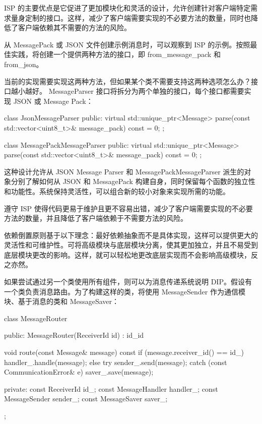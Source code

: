 ISP 的主要优点是它促进了更加模块化和灵活的设计，允许创建针对客户端特定需求量身定制的接口。这样，减少了客户端需要实现的不必要方法的数量，同时也降低了客户端依赖其不需要的方法的风险。

从 MessagePack 或 JSON 文件创建示例消息时，可以观察到 ISP 的示例。按照最佳实践，将创建一个提供两种方法的接口，即 from\_message\_pack 和 from\_json。

当前的实现需要实现这两种方法，但如果某个类不需要支持这两种选项怎么办？接口越小越好。 MessageParser 接口将拆分为两个单独的接口，每个接口都需要实现 JSON 或 Message Pack：

\begin{cpp}
class JsonMessageParser {
public:
    virtual std::unique_ptr<Message>
    parse(const std::vector<uint8_t>& message_pack)
        const = 0;
};

class MessagePackMessageParser {
public:
    virtual std::unique_ptr<Message>
    parse(const std::vector<uint8_t>& message_pack)
        const = 0;
};
\end{cpp}

这种设计允许从 JSON Message Parser 和 MessagePackMessageParser 派生的对象分别了解如何从 JSON 和 MessagePack 构建自身，同时保留每个函数的独立性和功能性。系统保持灵活性，可以组合新的较小对象来实现所需的功能。

遵守 ISP 使得代码更易于维护且更不容易出错，减少了客户端需要实现的不必要方法的数量，并且降低了客户端依赖于不需要方法的风险。


依赖倒置原则基于以下理念：最好依赖抽象而不是具体实现，这样可以提供更大的灵活性和可维护性。可将高级模块与底层模块分离，使其更加独立，并且不易受到底层模块更改的影响。这样，就可以轻松地更改底层实现而不会影响高级模块，反之亦然。

如果尝试通过另一个类使用所有组件，则可以为消息传递系统说明 DIP。假设有一个类负责消息路由。为了构建这样的类，将使用 MessageSender 作为通信模块、基于消息的类和 MessageSaver：

\begin{cpp}
class MessageRouter {
public:
    MessageRouter(ReceiverId id)
        : id_{id} {}

    void route(const Message& message) const {
        if (message.receiver_id() == id_) {
            handler_.handle(message);
        } else {
            try {
                sender_.send(message);
            } catch (const CommunicationError& e) {
                saver_.save(message);
            }
        }
    }

private:
    const ReceiverId id_;
    const MessageHandler handler_;
    const MessageSender sender_;
    const MessageSaver saver_;
};
\end{cpp}

